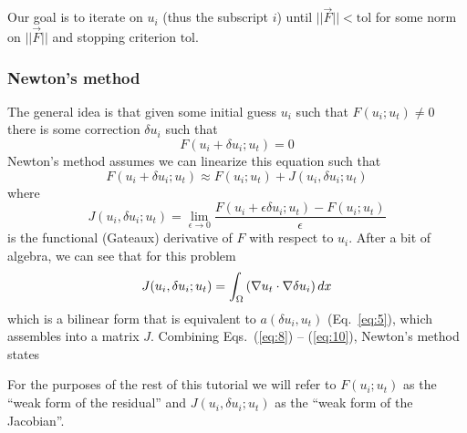 Our goal is to iterate on $u_{i}$ (thus the subscript
$i$) until $||\vec{F}||<\mathrm{tol}$ for some norm on $||\vec{F}||$ and stopping
criterion $\mathrm{tol}$.

\subsubsection{Newton's method}
\label{sec:newtons-method}

The general idea is that given some initial guess $u_{i}$ such that
$F(u_{i}; u_{t}) \neq 0$ there is some correction $\delta u_{i}$ such
that
\begin{equation}
  \label{eq:8}
  F(u_{i} + \delta u_{i}; u_{t}) = 0
\end{equation}
Newton's method assumes we can linearize this equation such that
\begin{equation}
  \label{eq:9}
   F(u_{i} + \delta u_{i}; u_{t}) \approx F(u_{i};u_{t}) +
   J(u_{i},\delta u_{i}; u_{t})
\end{equation}
where 
\begin{equation}
  \label{eq:10}
  J(u_{i},\delta u_{i}; u_{t}) = \lim_{\epsilon\rightarrow 0}
  \frac{F(u_{i}+\epsilon\delta u_{i};u_{t}) - F(u_{i};u_{t})}{\epsilon}
\end{equation}
is the functional (Gateaux) derivative of $F$ with respect to
$u_{i}$.  After a bit of algebra, we can see that for this problem
\begin{equation}
  \label{eq:11}
  J(u_{i},\delta u_{i}; u_{t}) = \int_{\Omega} \left(
    \nabla u_{t}\cdot\nabla \delta u_{i} \right)dx
\end{equation}
which is a bilinear form that is equivalent to $a(\delta u_{i},u_{t})$
(Eq.\ \ref{eq:5}), which assembles into a matrix $J$. Combining Eqs.\
(\ref{eq:8}) -- (\ref{eq:10}), Newton's method
states
\begin{quote}
\end{quote}
For the purposes of the rest of this tutorial we will refer to
$F(u_{i};u_{t})$ as the ``weak form of the residual'' and
$J(u_{i},\delta u_{i};u_{t})$ as the ``weak form of the Jacobian''.

